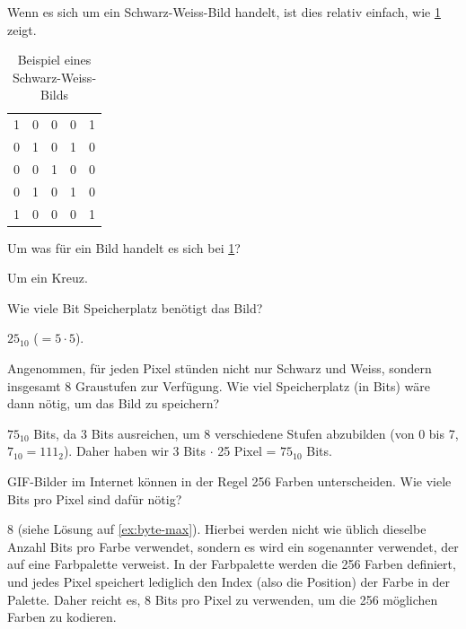 Wenn es sich um ein Schwarz-Weiss-Bild handelt, ist dies relativ einfach, wie \cref{table:bw-img} zeigt.

\begin{table}[H]
	\centering
	\begin{tabular}{lllll}
		1 & 0 & 0 & 0 & 1 \\
		0 & 1 & 0 & 1 & 0 \\
		0 & 0 & 1 & 0 & 0 \\
		0 & 1 & 0 & 1 & 0 \\
		1 & 0 & 0 & 0 & 1
	\end{tabular}
	\caption{Beispiel eines Schwarz-Weiss-Bilds}
	\label{table:bw-img}
\end{table}

\begin{myexercise}
	Um was für ein Bild handelt es sich bei \cref{table:bw-img}?
	\begin{myanswer}
		Um ein Kreuz.
	\end{myanswer}
\end{myexercise}

\begin{myexercise}
	Wie viele Bit Speicherplatz benötigt das Bild?
	\begin{myanswer}
		$25_{10}$ ($= 5\cdot 5$).
	\end{myanswer}
\end{myexercise}

\begin{myexercise}
	Angenommen, für jeden Pixel stünden nicht nur Schwarz und Weiss, sondern insgesamt 8 Graustufen zur Verfügung. Wie viel Speicherplatz (in Bits) wäre dann nötig, um das Bild zu speichern?
	\begin{myanswer}
		$75_{10}$ Bits, da 3 Bits ausreichen, um 8 verschiedene Stufen abzubilden (von 0 bis 7, $7_{10}=111_2$). Daher haben wir 3 Bits $\cdot$ 25 Pixel = $75_{10}$ Bits.
	\end{myanswer}
\end{myexercise}

\begin{myexercise}
	\gls{GIF}-Bilder im Internet können in der Regel 256 Farben unterscheiden. Wie viele Bits pro Pixel sind dafür nötig?
	\begin{myanswer}
		8 (siehe Lösung auf \cref{ex:byte-max}). Hierbei werden nicht wie üblich dieselbe Anzahl Bits pro Farbe verwendet, sondern es wird ein sogenannter  verwendet, der auf eine Farbpalette verweist. In der Farbpalette werden die 256 Farben definiert, und jedes Pixel speichert lediglich den Index (also die Position) der Farbe in der Palette. Daher reicht es, 8 Bits pro Pixel zu verwenden, um die 256 möglichen Farben zu kodieren.
	\end{myanswer}
\end{myexercise}

